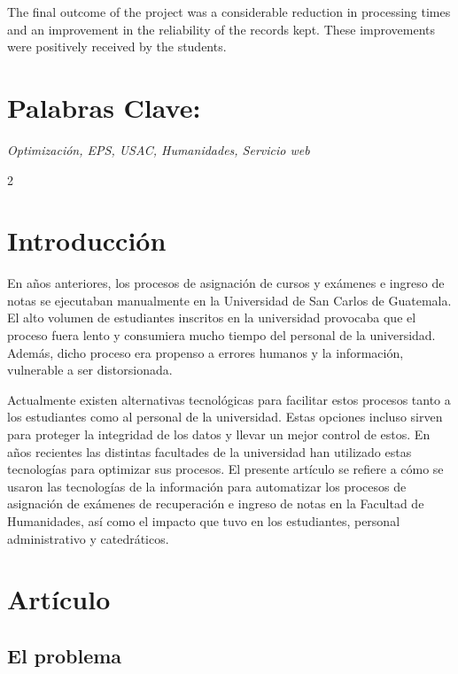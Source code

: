 \documentclass[12pt,spanish,Letterpaper,openany]{book}
\begin{document}
The final outcome of the project was a considerable reduction in processing times and an improvement in the reliability of the records kept. These improvements were positively received by the students.

\hypertarget{palabras-clave-2}{%
\section*{Palabras Clave:}\label{palabras-clave-2}}

\emph{Optimización, EPS, USAC, Humanidades, Servicio web}

\begin {multicols}{2}

\hypertarget{introduccion-3}{%
\section{Introducción}\label{introduccion-3}}

En años anteriores, los procesos de asignación de cursos y exámenes e ingreso de notas se ejecutaban manualmente en la Universidad de San Carlos de Guatemala. El alto volumen de estudiantes inscritos en la universidad provocaba que el proceso fuera lento y consumiera mucho tiempo del personal de la universidad. Además, dicho proceso era propenso a errores humanos y la información, vulnerable a ser distorsionada.

Actualmente existen alternativas tecnológicas para facilitar estos procesos tanto a los estudiantes como al personal de la universidad. Estas opciones incluso sirven para proteger la integridad de los datos y llevar un mejor control de estos. En años recientes las distintas facultades de la universidad han utilizado estas tecnologías para optimizar sus procesos. El presente artículo se refiere a cómo se usaron las tecnologías de la información para automatizar los procesos de asignación de exámenes de recuperación e ingreso de notas en la Facultad de Humanidades, así como el impacto que tuvo en los estudiantes, personal administrativo y catedráticos.

\hypertarget{articulo-2}{%
\section{Artículo}\label{articulo-2}}

\hypertarget{el-problema-1}{%
\subsection{El problema}\label{el-problema-1}}


\end{multicols}
\end{document}
